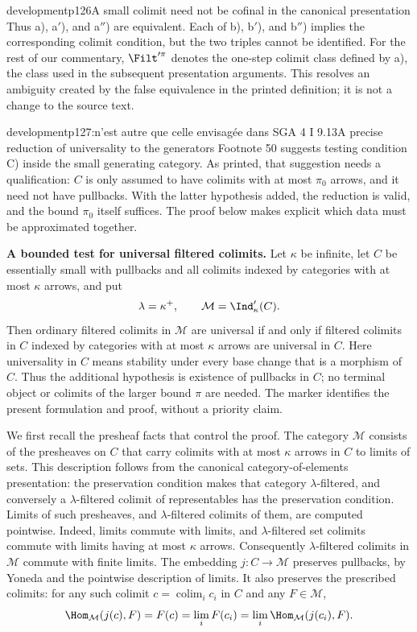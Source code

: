 \begin{dcomment}{development}{p126}{A small colimit need not be cofinal in the canonical presentation}
Thus a), a$'$), and a$''$) are equivalent. Each of b), b$'$), and b$''$) implies the corresponding colimit condition, but the two triples cannot be identified. For the rest of our commentary, $\Filt'^\pi$ denotes the one-step colimit class defined by a), the class used in the subsequent presentation arguments. This resolves an ambiguity created by the false equivalence in the printed definition; it is not a change to the source text.
\end{dcomment}

\begin{dcomment}{development}{p127:n'est autre que celle envisagée dans SGA 4 I 9.13}{A precise reduction of universality to the generators}
Footnote 50 suggests testing condition C) inside the small generating category. As printed, that suggestion needs a qualification: $C$ is only assumed to have colimits with at most $\pi_0$ arrows, and it need not have pullbacks. With the latter hypothesis added, the reduction is valid, and the bound $\pi_0$ itself suffices. The proof below makes explicit which data must be approximated together.

\textbf{A bounded test for universal filtered colimits.}\ours{}
Let $\kappa$ be infinite, let $C$ be essentially small with pullbacks and all colimits indexed by categories with at most $\kappa$ arrows, and put
\[
 \lambda=\kappa^+,
 \qquad \mathcal M=\Ind'_{\kappa}(C).
\]
Then ordinary filtered colimits in $\mathcal M$ are universal if and only if filtered colimits in $C$ indexed by categories with at most $\kappa$ arrows are universal in $C$. Here universality in $C$ means stability under every base change that is a morphism of $C$. Thus the additional hypothesis is existence of pullbacks in $C$; no terminal object or colimits of the larger bound $\pi$ are needed. The marker identifies the present formulation and proof, without a priority claim.

We first recall the presheaf facts that control the proof. The category $\mathcal M$ consists of the presheaves on $C$ that carry colimits with at most $\kappa$ arrows in $C$ to limits of sets. This description follows from the canonical category-of-elements presentation: the preservation condition makes that category $\lambda$-filtered, and conversely a $\lambda$-filtered colimit of representables has the preservation condition. Limits of such presheaves, and $\lambda$-filtered colimits of them, are computed pointwise. Indeed, limits commute with limits, and $\lambda$-filtered set colimits commute with limits having at most $\kappa$ arrows. Consequently $\lambda$-filtered colimits in $\mathcal M$ commute with finite limits. The embedding $j:C\to\mathcal M$ preserves pullbacks, by Yoneda and the pointwise description of limits. It also preserves the prescribed colimits: for any such colimit $c=\operatorname{colim}_i c_i$ in $C$ and any $F\in\mathcal M$,
\[
 \Hom_{\mathcal M}(j(c),F)=F(c)
   =\lim_i F(c_i)
   =\lim_i\Hom_{\mathcal M}(j(c_i),F).
\]


\end{dcomment}
